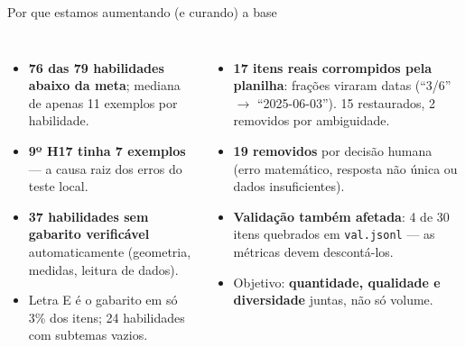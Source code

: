 \documentclass[aspectratio=169,11pt]{beamer}
\begin{document}
\begin{frame}{Por que estamos aumentando (e curando) a base}
  \small
  \begin{columns}[T]
    \begin{itemize}\setlength\itemsep{4pt}
      \item[\faChartBar] \textbf{76 das 79 habilidades abaixo da meta}; mediana de apenas 11 exemplos por habilidade.
      \item[\faBug] \textbf{9º H17 tinha 7 exemplos} --- a causa raiz dos erros do teste local.
      \item[\faEyeSlash] \textbf{37 habilidades sem gabarito verificável} automaticamente (geometria, medidas, leitura de dados).
      \item[\faBalanceScale] Letra E é o gabarito em só 3\% dos itens; 24 habilidades com subtemas vazios.
    \end{itemize}
    \begin{itemize}\setlength\itemsep{4pt}
      \item[\faFileExcel] \textbf{17 itens reais corrompidos pela planilha}: frações viraram datas (``3/6'' $\to$ ``2025-06-03''). 15 restaurados, 2 removidos por ambiguidade.
      \item[\faTrash] \textbf{19 removidos} por decisão humana (erro matemático, resposta não única ou dados insuficientes).
      \item[\faClipboardCheck] \textbf{Validação também afetada}: 4 de 30 itens quebrados em \texttt{val.jsonl} --- as métricas devem descontá-los.
      \item[\faBullseye] Objetivo: \textbf{quantidade, qualidade e diversidade} juntas, não só volume.
    \end{itemize}
  \end{columns}
\end{frame}

\end{document}
